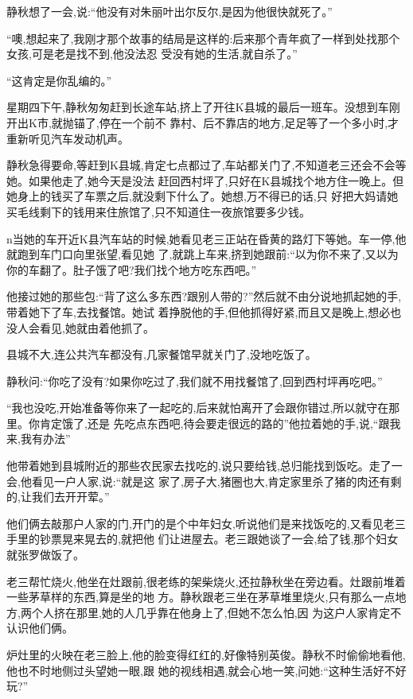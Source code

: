 ﻿\documentclass[12pt]{article}
\begin{document}
静秋想了一会,说:``他没有对朱丽叶出尔反尔,是因为他很快\myrule 就死了。''

``噢,想起来了,我刚才那个故事的结局是这样的:后来那个青年疯了一样到处找那个女孩,可是老是找不到,他没法忍
受没有她的生活,就\myrule 自杀了。''

``这肯定是你乱编的。''

星期四下午,静秋匆匆赶到长途车站,挤上了开往K县城的最后一班车。没想到车刚开出K市,就抛锚了,停在一个前不
靠村、后不靠店的地方,足足等了一个多小时,才重新听见汽车发动机声。

静秋急得要命,等赶到K县城,肯定七点都过了,车站都关门了,不知道老三还会不会等她。如果他走了,她今天是没法
赶回西村坪了,只好在K县城找个地方住一晚上。但她身上的钱买了车票之后,就没剩下什么了。她想,万不得已的话,只
好把大妈请她买毛线剩下的钱用来住旅馆了,只不知道住一夜旅馆要多少钱。

n当她的车开近K县汽车站的时候,她看见老三正站在昏黄的路灯下等她。车一停,他就跑到车门口向里张望,看见她
了,就跳上车来,挤到她跟前:``以为你不来了,又以为你的车\myrule 翻了。肚子饿了吧?我们找个地方吃东西吧。''

他接过她的那些包:``背了这么多东西?跟别人带的?''然后就不由分说地抓起她的手,带着她下了车,去找餐馆。她试
着挣脱他的手,但他抓得好紧,而且又是晚上,想必也没人会看见,她就由着他抓了。

县城不大,连公共汽车都没有,几家餐馆早就关门了,没地吃饭了。

静秋问:``你吃了没有?如果你吃过了,我们\myrule 就不用找餐馆了,回到西村坪再吃吧。''

``我也没吃,开始准备等你来了一起吃的,后来就怕离开了会跟你错过,所以就守在那里\myrule 。你肯定饿了,还是
先吃点东西吧,待会要走很远的路的\myrule ''他拉着她的手,说,``跟我来,我有办法\myrule ''

他带着她到县城附近的那些农民家去找吃的,说只要给钱,总归能找到饭吃。走了一会,他看见一户人家,说:``就是这
家了,房子大,猪圈也大,肯定家里杀了猪的肉还有剩的,让我们去开开荤。''

他们俩去敲那户人家的门,开门的是个中年妇女,听说他们是来找饭吃的,又看见老三手里的钞票晃来晃去的,就把他
们让进屋去。老三跟她谈了一会,给了钱,那个妇女就张罗做饭了。

老三帮忙烧火,他坐在灶跟前,很老练的架柴烧火,还拉静秋坐在旁边看。灶跟前堆着一些茅草样的东西,算是坐的地
方。静秋跟老三坐在茅草堆里烧火,只有那么一点地方,两个人挤在那里,她的人几乎靠在他身上了,但她不怎么怕,因
为这户人家肯定不认识他们俩。

炉灶里的火映在老三脸上,他的脸变得红红的,好像特别英俊。静秋不时偷偷地看他,他也不时地侧过头望她一眼,跟
她的视线相遇,就会心地一笑,问她:``这种生活好不好玩?''
\end{document}
